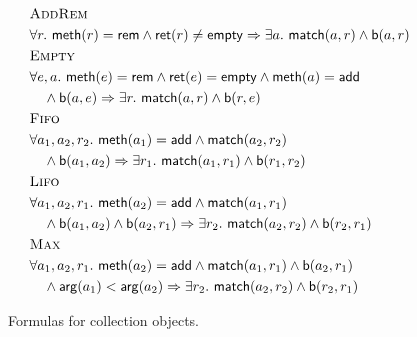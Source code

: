 \begin{figure}

  \footnotesize
  \begin{align*}
    & \textsc{AddRem} \\
    & \forall r.\ {\sf meth}(r) = {\sf rem} \land {\sf ret}(r) \neq {\sf empty} \implies
      \exists a.\ {\sf match}(a,r) \land {\sf b}(a,r)
    \\
    & \textsc{Empty} \\
    & \forall e, a.\ {\sf meth}(e) = {\sf rem} \land {\sf ret}(e) = {\sf empty} \land {\sf meth}(a) = {\sf add} \\
    & \quad \land {\sf b}(a,e) \implies \exists r.\ {\sf match}(a,r) \land {\sf b}(r,e)
    \\
    & \textsc{Fifo} \\
    & \forall a_1, a_2, r_2.\ {\sf meth}(a_1) = {\sf add} \land {\sf match}(a_2,r_2) \\
    & \quad \land {\sf b}(a_1,a_2) \implies \exists r_1.\ {\sf match}(a_1,r_1) \land {\sf b}(r_1,r_2)
    \\
    & \textsc{Lifo} \\
    & \forall a_1, a_2, r_1.\ {\sf meth}(a_2) = {\sf add} \land {\sf match}(a_1,r_1) \\
    & \quad \land {\sf b}(a_1,a_2) \land {\sf b}(a_2,r_1) \implies \exists r_2.\ {\sf match}(a_2,r_2) \land {\sf b}(r_2,r_1)
    \\
    & \textsc{Max} \\
    & \forall a_1, a_2, r_1.\ {\sf meth}(a_2) = {\sf add} \land {\sf match}(a_1,r_1) \land {\sf b}(a_2,r_1) \\
    & \quad \land {\sf arg}(a_1) < {\sf arg}(a_2) \implies \exists r_2.\ {\sf match}(a_2,r_2) \land {\sf b}(r_2,r_1)
  \end{align*}

  \caption{Formulas for collection objects.}
  \label{fig:formulas:collecions}

\end{figure}

